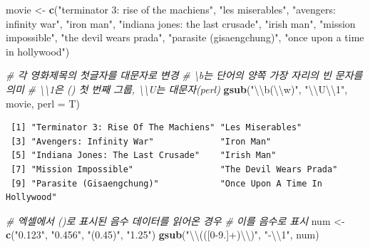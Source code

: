 \documentclass[
  11pt,
]{krantz}
\newenvironment{Shaded}{\begin{snugshade}}{\end{snugshade}}
\newcommand{\CharTok}[1]{\textcolor[rgb]{0.5,0.5,0.5}{#1}}
\newcommand{\CommentTok}[1]{\textcolor[rgb]{0.37,0.37,0.37}{\textit{#1}}}
\newcommand{\DataTypeTok}[1]{\textcolor[rgb]{0.27,0.27,0.27}{#1}}
\newcommand{\KeywordTok}[1]{\textcolor[rgb]{0.27,0.27,0.27}{\textbf{#1}}}
\newcommand{\NormalTok}[1]{#1}
\newcommand{\StringTok}[1]{\textcolor[rgb]{0.5,0.5,0.5}{#1}}
\begin{document}
\begin{Shaded}
\begin{Highlighting}[]
\NormalTok{movie <-}\StringTok{ }\KeywordTok{c}\NormalTok{(}\StringTok{"terminator 3: rise of the machiens"}\NormalTok{, }
           \StringTok{"les miserables"}\NormalTok{, }
           \StringTok{"avengers: infinity war"}\NormalTok{, }
           \StringTok{"iron man"}\NormalTok{, }
           \StringTok{"indiana jones: the last crusade"}\NormalTok{, }
           \StringTok{"irish man"}\NormalTok{, }
           \StringTok{"mission impossible"}\NormalTok{, }
           \StringTok{"the devil wears prada"}\NormalTok{, }
           \StringTok{"parasite (gisaengchung)"}\NormalTok{, }
           \StringTok{"once upon a time in hollywood"}\NormalTok{)}

\CommentTok{# 각 영화제목의 첫글자를 대문자로 변경}
\CommentTok{# \textbackslash{}b는 단어의 양쪽 가장 자리의 빈 문자를 의미}
\CommentTok{# \textbackslash{}\textbackslash{}1은 () 첫 번째 그룹, \textbackslash{}\textbackslash{}U는 대문자(perl)}
\KeywordTok{gsub}\NormalTok{(}\StringTok{"}\CharTok{\textbackslash{}\textbackslash{}}\StringTok{b(}\CharTok{\textbackslash{}\textbackslash{}}\StringTok{w)"}\NormalTok{, }\StringTok{"}\CharTok{\textbackslash{}\textbackslash{}}\StringTok{U}\CharTok{\textbackslash{}\textbackslash{}}\StringTok{1"}\NormalTok{, movie, }\DataTypeTok{perl =}\NormalTok{ T)}
\end{Highlighting}
\end{Shaded}

\begin{verbatim}
 [1] "Terminator 3: Rise Of The Machiens" "Les Miserables"                    
 [3] "Avengers: Infinity War"             "Iron Man"                          
 [5] "Indiana Jones: The Last Crusade"    "Irish Man"                         
 [7] "Mission Impossible"                 "The Devil Wears Prada"             
 [9] "Parasite (Gisaengchung)"            "Once Upon A Time In Hollywood"     
\end{verbatim}

\begin{Shaded}
\begin{Highlighting}[]
\CommentTok{# 엑셀에서 ()로 표시된 음수 데이터를 읽어온 경우}
\CommentTok{# 이를 음수로 표시}
\NormalTok{num <-}\StringTok{ }\KeywordTok{c}\NormalTok{(}\StringTok{"0.123"}\NormalTok{, }\StringTok{"0.456"}\NormalTok{, }\StringTok{"(0.45)"}\NormalTok{, }\StringTok{"1.25"}\NormalTok{)}
\KeywordTok{gsub}\NormalTok{(}\StringTok{"}\CharTok{\textbackslash{}\textbackslash{}}\StringTok{(([0-9.]+)}\CharTok{\textbackslash{}\textbackslash{}}\StringTok{)"}\NormalTok{, }\StringTok{"-}\CharTok{\textbackslash{}\textbackslash{}}\StringTok{1"}\NormalTok{, num)}
\end{Highlighting}
\end{Shaded}
\end{document}

